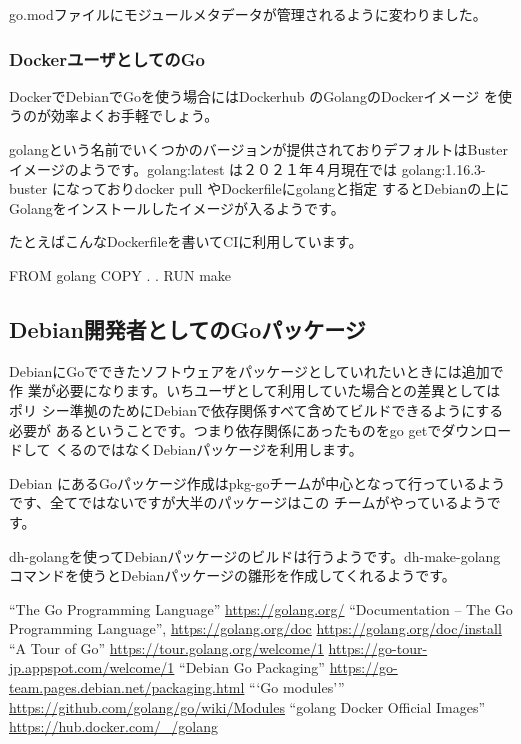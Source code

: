 \documentclass[mingoth,a4paper]{jsarticle}
\begin{document}
go.modファイルにモジュールメタデータが管理されるように変わりました。

\subsubsection{DockerユーザとしてのGo}

DockerでDebianでGoを使う場合にはDockerhub のGolangのDockerイメージ
\cite{docker:go}を使うのが効率よくお手軽でしょう。

golangという名前でいくつかのバージョンが提供されておりデフォルトはBuster
イメージのようです。golang:latest は２０２１年４月現在では
golang:1.16.3-buster になっておりdocker pull やDockerfileにgolangと指定
するとDebianの上にGolangをインストールしたイメージが入るようです。

たとえばこんなDockerfileを書いてCIに利用しています。

\begin{commandline}
FROM golang
COPY . .
RUN make
\end{commandline}


\subsection{Debian開発者としてのGoパッケージ}

DebianにGoでできたソフトウェアをパッケージとしていれたいときには追加で作
業が必要になります。いちユーザとして利用していた場合との差異としてはポリ
シー準拠のためにDebianで依存関係すべて含めてビルドできるようにする必要が
あるということです。つまり依存関係にあったものをgo getでダウンロードして
くるのではなくDebianパッケージを利用します。

Debian にあるGoパッケージ作成はpkg-goチームが中心となって行っているよう
です\cite{debian-go-packaging}、全てではないですが大半のパッケージはこの
チームがやっているようです。

dh-golangを使ってDebianパッケージのビルドは行うようです。dh-make-golang
コマンドを使うとDebianパッケージの雛形を作成してくれるようです。

\begin{thebibliography}{1}
  ``The Go Programming Language'' \url{https://golang.org/}
  ``Documentation -- The Go Programming Language'', \url{https://golang.org/doc}
  \url{https://golang.org/doc/install}
  ``A Tour of Go'' \url{https://tour.golang.org/welcome/1}
  \url{https://go-tour-jp.appspot.com/welcome/1}
  ``Debian Go Packaging'' \url{https://go-team.pages.debian.net/packaging.html}
  ```Go modules''' \url{https://github.com/golang/go/wiki/Modules}
  ``golang Docker Official Images'' \url{https://hub.docker.com/_/golang}
\end{thebibliography}
\end{document}
